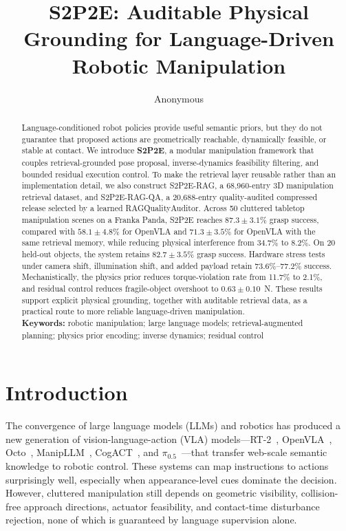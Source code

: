 \documentclass[12pt]{article}
\begin{document}
\title{S2P2E: Auditable Physical Grounding for Language-Driven Robotic Manipulation}

\author{%
\parbox{0.92\textwidth}{\centering
Anonymous
}%
}
\date{}

\maketitle

\begin{abstract}
Language-conditioned robot policies provide useful semantic priors, but they do not guarantee that proposed actions are geometrically reachable, dynamically feasible, or stable at contact. We introduce \textbf{S2P2E}, a modular manipulation framework that couples retrieval-grounded pose proposal, inverse-dynamics feasibility filtering, and bounded residual execution control. To make the retrieval layer reusable rather than an implementation detail, we also construct S2P2E-RAG, a 68,960-entry 3D manipulation retrieval dataset, and S2P2E-RAG-QA, a 20,688-entry quality-audited compressed release selected by a learned RAGQualityAuditor. Across 50 cluttered tabletop manipulation scenes on a Franka Panda, S2P2E reaches $87.3\pm3.1\%$ grasp success, compared with $58.1\pm4.8\%$ for OpenVLA and $71.3\pm3.5\%$ for OpenVLA with the same retrieval memory, while reducing physical interference from 34.7\% to 8.2\%. On 20 held-out objects, the system retains $82.7\pm3.5\%$ grasp success. Hardware stress tests under camera shift, illumination shift, and added payload retain $73.6\%$--$77.2\%$ success. Mechanistically, the physics prior reduces torque-violation rate from 11.7\% to 2.1\%, and residual control reduces fragile-object overshoot to $0.63\pm0.10$~N. These results support explicit physical grounding, together with auditable retrieval data, as a practical route to more reliable language-driven manipulation.
\\[2pt]
\noindent\textbf{Keywords:} robotic manipulation; large language models; retrieval-augmented planning; physics prior encoding; inverse dynamics; residual control
\end{abstract}


\section{Introduction}

The convergence of large language models (LLMs) and robotics has produced a new generation of vision-language-action (VLA) models---RT-2~\cite{brohan2023rt2}, OpenVLA~\cite{kim2024openvla}, Octo~\cite{octo2024octo}, ManipLLM~\cite{li2024manipllm}, CogACT~\cite{li2024cogact}, and $\pi_{0.5}$~\cite{black2025pi05}---that transfer web-scale semantic knowledge to robotic control. These systems can map instructions to actions surprisingly well, especially when appearance-level cues dominate the decision. However, cluttered manipulation still depends on geometric visibility, collision-free approach directions, actuator feasibility, and contact-time disturbance rejection, none of which is guaranteed by language supervision alone.
\end{document}
